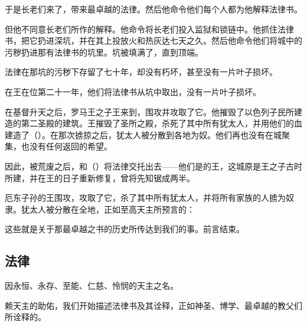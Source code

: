 于是长老们来了，带来最卓越的法律。然后他命令他们每个人都为他解释法律书。\par

但他不同意长老们所作的解释。他命令将长老们投入监狱和锁链中。他抓住法律书，把它扔进深坑，并在其上投放火和热灰达七天之久。然后他命令他们将城中的污秽扔进那有法律书的坑里。坑被填满了，直到顶端。\par

法律在那坑的污秽下存留了七十年，却没有朽坏，甚至没有一片叶子损坏。\par

在王在位第二十一年，他们将法律书从坑中取出，没有一片叶子损坏。\par

在基督升天之后，罗马王之子王来到，围攻并攻取了它。他摧毁了以色列子民所建造的第二圣殿的建筑。王摧毁了圣所之殿，杀死了其中所有犹太人，并用他们的血建造了（）。在那次掳掠之后，犹太人被分散到各地为奴。他们再也没有在城聚集，也没有任何返回的希望。\par

因此，被荒废之后，和（）将法律交托出去——他们是的王，这城原是王之子古时所建，并在王的日子重新修复，曾将先知锯成两半。\par

厄东子孙的王围攻，攻取了它，杀了其中所有犹太人，并将所有家族的人掳为奴隶。犹太人被分散在全地，正如至高天主所预言的：\par

这些就是关于那最卓越之书的历史所传达到我们的事。前言结束。\par


\subsection{法律}

因永恒、永存、至能、仁慈、怜悯的天主之名。\par

赖天主的助佑，我们开始描述法律书及其诠释，正如神圣、博学、最卓越的教父们所诠释的。\par

